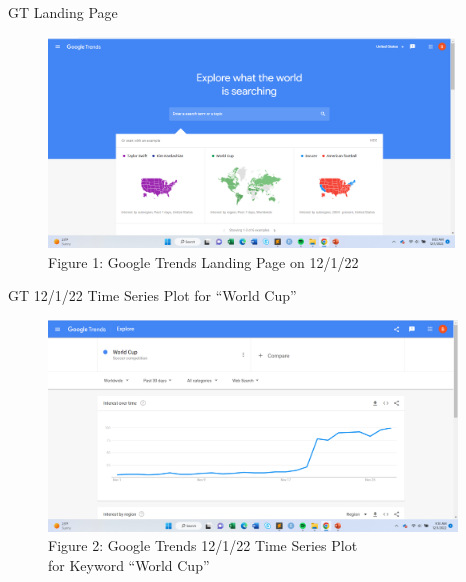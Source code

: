 \documentclass[pdf]{beamer}
\theoremstyle{remark}
\theoremstyle{definition}
\begin{document}
\begin{frame}[t]{GT Landing Page}
\begin{figure}[htbp]
  \captionsetup{justification=centering}
  \includegraphics[height=5.6cm, trim=0.0cm 0.0cm 0.0cm 0.0cm width=5.6cm]{Images/Google_Trends_1_120122.png}
  \caption{Figure {\color{franklinblue} 1}: Google Trends Landing Page on 12/1/22}
\end{figure}
\end{frame}

\begin{frame}[t]{GT 12/1/22 Time Series Plot for ``World Cup''}
\begin{figure}[htbp]
  \captionsetup{justification=centering}
  \includegraphics[height=5.6cm, trim=0.0cm 0.0cm 0.0cm 0.0cm width=5.6cm]{Images/Google_Trends_2_120122.png}
  \caption{Figure {\color{franklinblue} 2}: Google Trends 12/1/22 Time Series Plot \\ for Keyword ``World Cup''}
\end{figure}
\end{frame}
\end{document}
